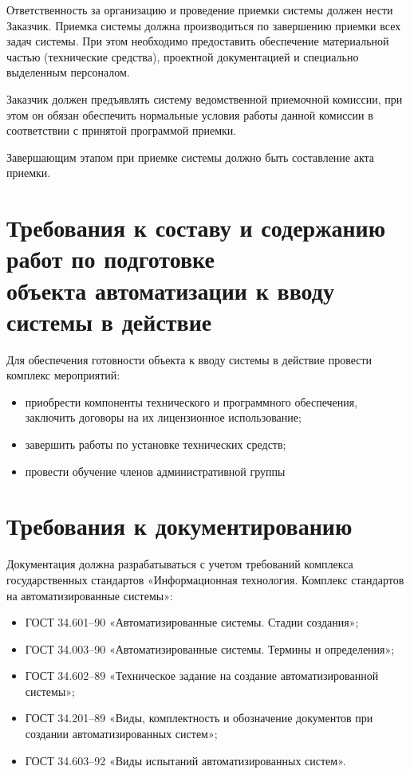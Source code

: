 \documentclass[14pt]{extreport}
\begin{document}
Ответственность за организацию и проведение приемки системы должен нести Заказчик. Приемка системы должна производиться по завершению приемки всех задач системы. При этом необходимо предоставить обеспечение материальной частью (технические средства), проектной документацией и специально выделенным персоналом.

Заказчик должен предъявлять систему ведомственной приемочной комиссии, при этом он обязан обеспечить нормальные условия работы данной комиссии в соответствии с принятой программой приемки.

Завершающим этапом при приемке системы должно быть составление акта приемки.


\chapter{Требования к составу и содержанию работ по подготовке \\
объекта автоматизации к вводу системы в действие}
Для обеспечения готовности объекта к вводу системы в действие провести комплекс мероприятий:
\begin{itemize}
	\item приобрести компоненты технического и программного обеспечения, заключить договоры на их лицензионное использование;
	\item завершить работы по установке технических средств;
	\item провести обучение членов административной группы
\end{itemize}


\chapter{Требования к документированию}
Документация должна разрабатываться с учетом требований комплекса государственных стандартов «Информационная технология. Комплекс стандартов на автоматизированные системы»:
\begin{itemize}
	\item ГОСТ 34.601–90 «Автоматизированные системы. Стадии создания»;
	\item ГОСТ 34.003–90 «Автоматизированные системы. Термины и определения»;
	\item ГОСТ 34.602–89 «Техническое задание на создание автоматизированной системы»;
	\item ГОСТ 34.201–89 «Виды, комплектность и обозначение документов при создании автоматизированных систем»;
	\item ГОСТ 34.603–92 «Виды испытаний автоматизированных систем».
\end{itemize}
\end{document}
